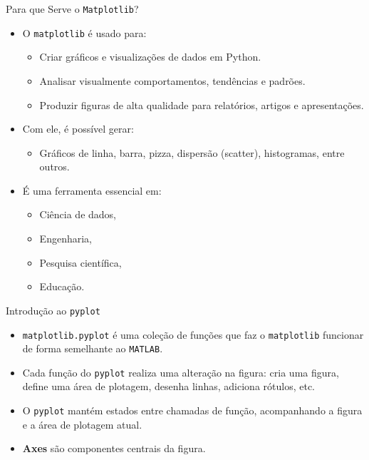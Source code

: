 \begin{frame}{Para que Serve o \texttt{Matplotlib}?}
    \begin{itemize}
        \item O \texttt{matplotlib} é usado para:
        \begin{itemize}
            \item Criar gráficos e visualizações de dados em Python.
            \item Analisar visualmente comportamentos, tendências e padrões.
            \item Produzir figuras de alta qualidade para relatórios, artigos e apresentações.
        \end{itemize}

        \item Com ele, é possível gerar:
        \begin{itemize}
            \item Gráficos de linha, barra, pizza, dispersão (scatter), histogramas, entre outros.
        \end{itemize}

        \item É uma ferramenta essencial em:
        \begin{itemize}
            \item Ciência de dados,
            \item Engenharia,
            \item Pesquisa científica,
            \item Educação.
        \end{itemize}
    \end{itemize}
\end{frame}


\begin{frame}{Introdução ao \texttt{pyplot}}
    \begin{itemize}
        \item \texttt{matplotlib.pyplot} é uma coleção de funções que faz o \texttt{matplotlib} funcionar de forma semelhante ao \texttt{MATLAB}.
        \item Cada função do \texttt{pyplot} realiza uma alteração na figura: cria uma figura, define uma área de plotagem, desenha linhas, adiciona rótulos, etc.
        \item O \texttt{pyplot} mantém estados entre chamadas de função, acompanhando a figura e a área de plotagem atual.
        \item \textbf{Axes} são componentes centrais da figura.
    \end{itemize}
\end{frame}



